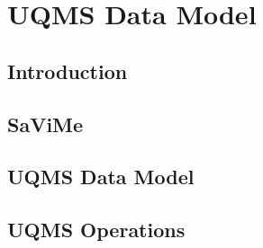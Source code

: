 \chapter{UQMS Data Model}\label{cap_data_model}

\section{Introduction}

\section{SaViMe}

\section{UQMS Data Model}

\section{UQMS Operations}
